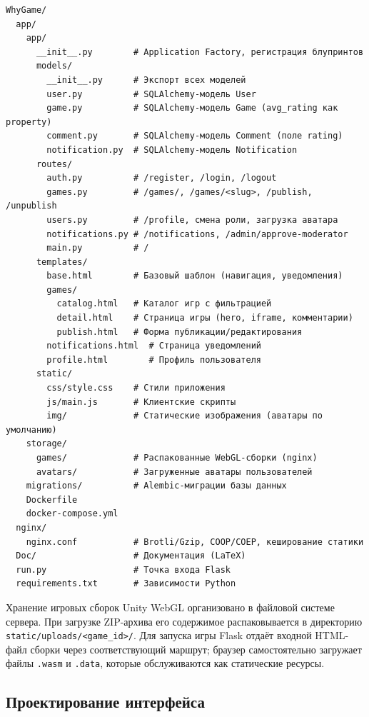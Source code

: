 \begin{lstlisting}[caption={Структура проекта WhyGame}, label={lst:structure}]
WhyGame/
  app/
    app/
      __init__.py        # Application Factory, регистрация блупринтов
      models/
        __init__.py      # Экспорт всех моделей
        user.py          # SQLAlchemy-модель User
        game.py          # SQLAlchemy-модель Game (avg_rating как property)
        comment.py       # SQLAlchemy-модель Comment (поле rating)
        notification.py  # SQLAlchemy-модель Notification
      routes/
        auth.py          # /register, /login, /logout
        games.py         # /games/, /games/<slug>, /publish, /unpublish
        users.py         # /profile, смена роли, загрузка аватара
        notifications.py # /notifications, /admin/approve-moderator
        main.py          # /
      templates/
        base.html        # Базовый шаблон (навигация, уведомления)
        games/
          catalog.html   # Каталог игр с фильтрацией
          detail.html    # Страница игры (hero, iframe, комментарии)
          publish.html   # Форма публикации/редактирования
        notifications.html  # Страница уведомлений
        profile.html        # Профиль пользователя
      static/
        css/style.css    # Стили приложения
        js/main.js       # Клиентские скрипты
        img/             # Статические изображения (аватары по умолчанию)
    storage/
      games/             # Распакованные WebGL-сборки (nginx)
      avatars/           # Загруженные аватары пользователей
    migrations/          # Alembic-миграции базы данных
    Dockerfile
    docker-compose.yml
  nginx/
    nginx.conf           # Brotli/Gzip, COOP/COEP, кеширование статики
  Doc/                   # Документация (LaTeX)
  run.py                 # Точка входа Flask
  requirements.txt       # Зависимости Python
\end{lstlisting}

Хранение игровых сборок Unity WebGL организовано в файловой системе сервера.
При загрузке ZIP-архива его содержимое распаковывается в директорию
\texttt{static/uploads/<game\_id>/}. Для запуска игры Flask отдаёт входной
HTML-файл сборки через соответствующий маршрут; браузер самостоятельно загружает
файлы \texttt{.wasm} и \texttt{.data}, которые обслуживаются как статические
ресурсы.

\subsection{Проектирование интерфейса}

